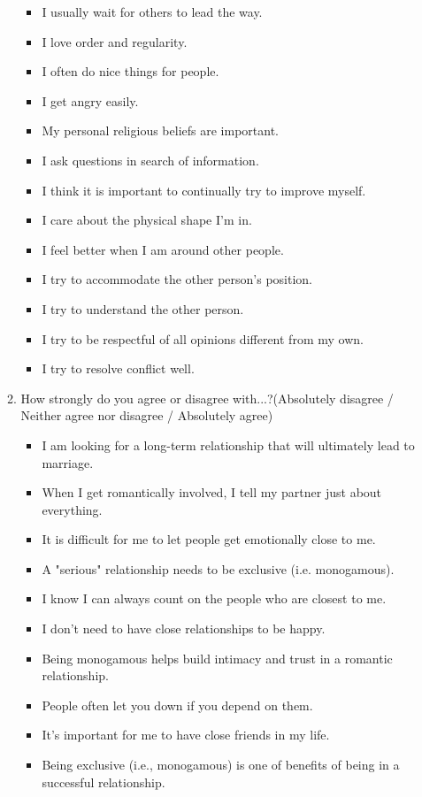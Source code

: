 \begin{appendices}
\begin{itemize}
\begin{enumerate}
\begin{itemize}
				\item I usually wait for others to lead the way.
				\item I love order and regularity.
				\item I often do nice things for people.
				\item I get angry easily.
				\item My personal religious beliefs are important.
				\item I ask questions in search of information.
				\item I think it is important to continually try to improve myself.
				\item I care about the physical shape I'm in.
				\item I feel better when I am around other people.
				\item I try to accommodate the other person's position.
				\item I try to understand the other person.
				\item I try to be respectful of all opinions different from my own.
				\item I try to resolve conflict well.
			\end{itemize}
			\item How strongly do you agree or disagree with...?(Absolutely disagree / Neither agree nor disagree / Absolutely agree)
			\begin{itemize}
				\item I am looking for a long-term relationship that will ultimately lead to marriage.
				\item When I get romantically involved, I tell my partner just about everything.
				\item It is difficult for me to let people get emotionally close to me.
				\item A "serious" relationship needs to be exclusive (i.e. monogamous).
				\item I know I can always count on the people who are closest to me.
				\item I don't need to have close relationships to be happy.
				\item Being monogamous helps build intimacy and trust in a romantic relationship.
				\item People often let you down if you depend on them.
				\item It's important for me to have close friends in my life.
				\item Being exclusive (i.e., monogamous) is one of benefits of being in a successful relationship.

\end{itemize}
\end{enumerate}
\end{itemize}
\end{appendices}
